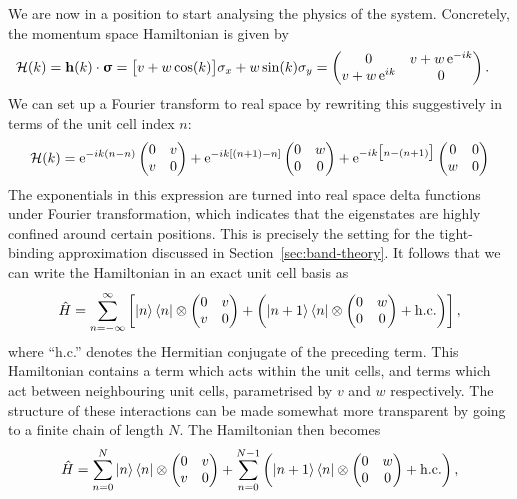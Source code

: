 We are now in a position to start analysing the physics of the system. Concretely, the momentum space Hamiltonian is given by
\begin{align*}
	\mathcal{H}(k) &= \vb{h}(k)\cdot\bm{\upsigma} = \big[v + w\cos(k)\big]\sigma_x + w\sin(k)\sigma_y = \begin{pmatrix}
		0 & v + w\operatorname{e}^{-ik} \\
		v + w\operatorname{e}^{ik} & 0
	\end{pmatrix}.
\end{align*}
We can set up a Fourier transform to real space by rewriting this suggestively in terms of the unit cell index $n$:
\[
	\mathcal{H}(k) = \operatorname{e}^{-ik(n-n)}\begin{pmatrix}
		0 & v \\
		v & 0
	\end{pmatrix} + \operatorname{e}^{-ik[(n+1)-n]}\begin{pmatrix}
		0 & w \\
		0 & 0
	\end{pmatrix} + \operatorname{e}^{-ik\big[n-(n+1)\big]}\begin{pmatrix}
		0 & 0 \\
		w & 0
	\end{pmatrix}
\]
The exponentials in this expression are turned into real space delta functions under Fourier transformation, which indicates that the eigenstates are highly confined around certain positions. This is precisely the setting for the tight-binding approximation discussed in Section~\ref{sec:band-theory}. It follows that we can write the Hamiltonian in an exact unit cell basis as
\begin{equation}\label{eq:SSH-n-Hamil}
		\hat{H} = \sum_{n=-\infty}^{\infty}\left[\ket{n}\bra{n}\otimes\begin{pmatrix}
			0 & v \\
			v & 0
		\end{pmatrix} + \left(\ket{n+1}\bra{n}\otimes\begin{pmatrix}
			0 & w \\
			0 & 0
		\end{pmatrix} + {\rm h.c.}\right)\right], 
\end{equation}
where ``h.c.'' denotes the Hermitian conjugate of the preceding term. This Hamiltonian contains a term which acts within the unit cells, and terms which act between neighbouring unit cells, parametrised by $v$ and $w$ respectively. The structure of these interactions can be made somewhat more transparent by going to a finite chain of length $N$. The Hamiltonian then becomes
\[
	\hat{H} = \sum_{n=0}^{N}\ket{n}\bra{n}\otimes\begin{pmatrix}
		0 & v \\
		v & 0
	\end{pmatrix} + \sum_{n=0}^{N-1}\left(\ket{n+1}\bra{n}\otimes\begin{pmatrix}
		0 & w \\
		0 & 0
	\end{pmatrix} + {\rm h.c.}\right),
\]
